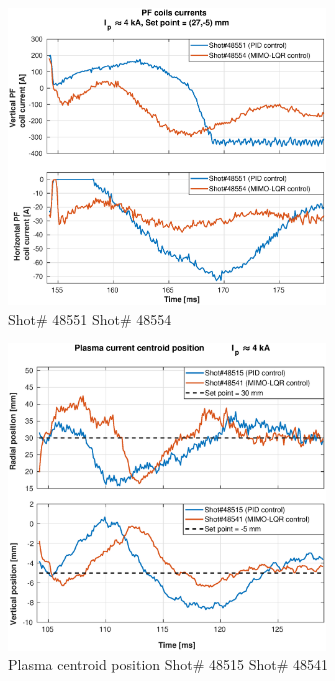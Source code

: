 \begin{figure}
	\centering
	\includegraphics[width=0.75\textwidth]{Chp5/PIDvsMIMO_551_554_curr_2.eps}
	\caption{  Shot\# 48551 Shot\# 48554}
\end{figure}
\begin{figure}
	\centering
	\includegraphics[width=0.75\textwidth]{Chp5/PIDvsMIMO_515_541_2.eps}
	\caption{Plasma centroid position  Shot\# 48515 Shot\# 48541}
\end{figure}

